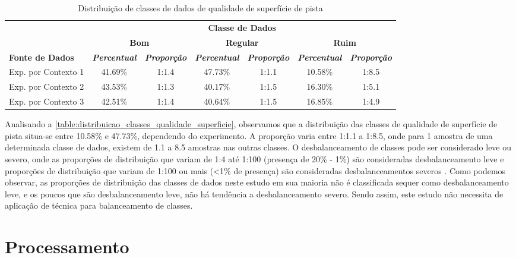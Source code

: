 \begin{table}[h]
\caption{Distribuição de classes de dados de qualidade de superfície de pista}
\label{table:distribuicao_classes_qualidade_superficie}
\centering
\scriptsize
\begin{tabular}{lcccccc}
\cmidrule(l){2-7}
\multicolumn{1}{c}{\multirow{2}{*}{\textbf{}}} & 
\multicolumn{6}{c}{\textbf{Classe de Dados}} \\ \cmidrule(l){2-7} 
\multicolumn{1}{c}{} & 
\multicolumn{2}{c}{\textbf{Bom}} & 
\multicolumn{2}{c}{\textbf{Regular}} & 
\multicolumn{2}{c}{\textbf{Ruim}} \\ \midrule
\textbf{Fonte de Dados} & 
\textit{\textbf{Percentual}} & 
\textit{\textbf{Proporção}} & 
\textit{\textbf{Percentual}} & 
\textit{\textbf{Proporção}} & 
\textit{\textbf{Percentual}} & 
\textit{\textbf{Proporção}} \\ \midrule
Exp. por Contexto 1 & 41.69\% & 1:1.4 & 47.73\% & 1:1.1 & 10.58\% & 1:8.5 \\ \midrule
Exp. por Contexto 2 & 43.53\% & 1:1.3 & 40.17\% & 1:1.5 & 16.30\% & 1:5.1 \\ \midrule
Exp. por Contexto 3 & 42.51\% & 1:1.4 & 40.64\% & 1:1.5 & 16.85\% & 1:4.9 \\ \bottomrule
\end{tabular}
\end{table}

Analisando a \autoref{table:distribuicao_classes_qualidade_superficie}, observamos que a distribuição das classes de qualidade de superfície de pista situa-se entre 10.58\% e 47.73\%, dependendo do experimento. A proporção varia entre 1:1.1 a 1:8.5, onde para 1 amostra de uma determinada classe de dados, existem de 1.1 a 8.5 amostras nas outras classes. O desbalanceamento de classes pode ser considerado leve ou severo, onde as proporções de distribuição que variam de 1:4 até 1:100 (presença de 20\% - 1\%) são consideradas desbalanceamento leve e proporções de distribuição que variam de 1:100 ou mais (<1\% de presença) são consideradas desbalanceamentos severos \cite{Krawczyk2016,Brownlee2020}. Como podemos observar, as proporções de distribuição das classes de dados neste estudo em sua maioria não é classificada sequer como desbalanceamento leve, e os poucos que são desbalanceamento leve, não há tendência a desbalanceamento severo. Sendo assim, este estudo não necessita de aplicação de técnica para balanceamento de classes.

\section{Processamento}

